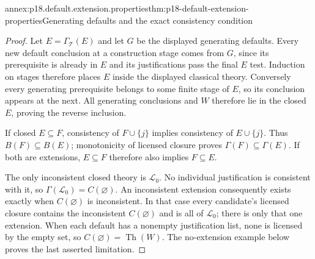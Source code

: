 \begin{annexitem}{annex:p18.default.extension.properties}{thm:p18-default-extension-properties}{Generating defaults and the exact consistency condition}
\begin{proof}
Let \(E=\Gamma_{\mathcal T}(E)\) and let \(G\)
be the displayed generating defaults. Every
new default conclusion at a construction
stage comes from \(G\), since its prerequisite
is already in \(E\) and its justifications
pass the final \(E\) test. Induction on
stages therefore places \(E\) inside the
displayed classical theory. Conversely every
generating prerequisite belongs to some
finite stage of \(E\), so its conclusion
appears at the next. All generating
conclusions and \(W\) therefore lie in
the closed \(E\), proving the reverse
inclusion.

If closed \(E\subseteq F\), consistency of
\(F\cup\{j\}\) implies consistency of
\(E\cup\{j\}\). Thus \(B(F)\subseteq B(E)\);
monotonicity of licensed closure proves
\(\Gamma(F)\subseteq\Gamma(E)\).
If both are extensions, \(E\subseteq F\)
therefore also implies \(F\subseteq E\).

The only inconsistent closed theory is
\(\mathcal L_0\). No individual justification
is consistent with it, so
\(\Gamma(\mathcal L_0)=C(\varnothing)\).
An inconsistent extension consequently
exists exactly when \(C(\varnothing)\)
is inconsistent. In that case every
candidate's licensed closure contains
the inconsistent \(C(\varnothing)\)
and is all of \(\mathcal L_0\);
there is only that one extension.
When each default has a nonempty
justification list, none is licensed
by the empty set, so
\(C(\varnothing)=\operatorname{Th}(W)\).
The no-extension example below proves
the last asserted limitation.
\end{proof}
\end{annexitem}

